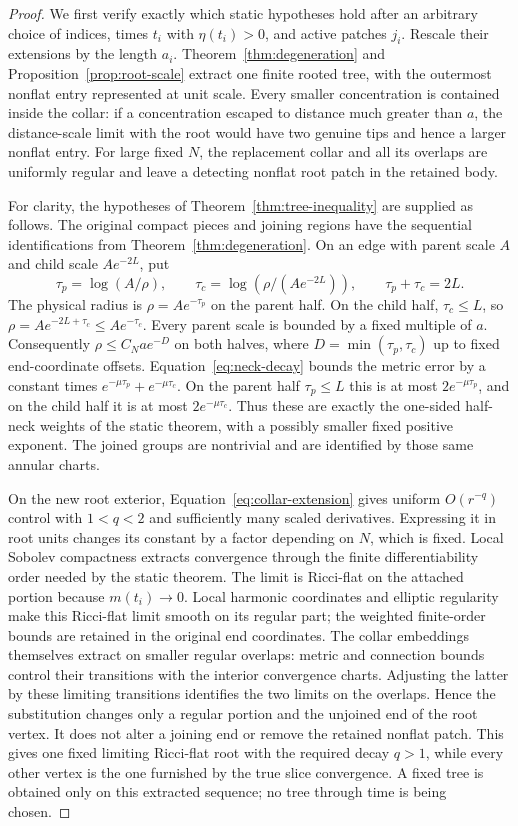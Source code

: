 \begin{proof}
We first verify exactly which static hypotheses hold after an
arbitrary choice of indices, times $t_i$ with $\eta(t_i)>0$, and
active patches $j_i$.  Rescale their extensions by the length $a_i$.
Theorem~\ref{thm:degeneration} and Proposition~\ref{prop:root-scale}
extract one finite rooted tree, with the outermost nonflat entry
represented at unit scale.  Every smaller concentration is contained
inside the collar: if a concentration escaped to distance much
greater than $a$, the distance-scale limit with the root would have
two genuine tips and hence a larger nonflat entry.  For large fixed
$N$, the replacement collar and all its overlaps are uniformly
regular and leave a detecting nonflat root patch in the retained
body.

For clarity, the hypotheses of Theorem~\ref{thm:tree-inequality}
are supplied as follows.  The original compact pieces and joining
regions have the sequential identifications from
Theorem~\ref{thm:degeneration}.  On an edge with parent scale $A$
and child scale $Ae^{-2L}$, put
\[
 \tau_p=\log(A/\rho),\qquad
 \tau_c=\log(\rho/(Ae^{-2L})),\qquad \tau_p+\tau_c=2L.
\]
The physical radius is $\rho=Ae^{-\tau_p}$ on the parent half.
On the child half, $\tau_c\le L$, so
$\rho=Ae^{-2L+\tau_c}\le Ae^{-\tau_c}$.
Every parent scale is bounded by a fixed multiple of $a$.
Consequently $\rho\le C_Nae^{-D}$ on both halves, where
$D=\min(\tau_p,\tau_c)$ up to fixed end-coordinate offsets.
Equation~\eqref{eq:neck-decay} bounds the metric error by a constant
times $e^{-\mu\tau_p}+e^{-\mu\tau_c}$.  On the parent half
$\tau_p\le L$ this is at most $2e^{-\mu\tau_p}$, and on the child
half it is at most $2e^{-\mu\tau_c}$.  Thus these are exactly the
one-sided half-neck weights of the static theorem, with a possibly
smaller fixed positive exponent.  The joined groups are nontrivial
and are identified by those same annular charts.

On the new root exterior, Equation~\eqref{eq:collar-extension}
gives uniform $O(r^{-q})$ control with $1<q<2$ and sufficiently many
scaled derivatives.  Expressing it in root units changes its
constant by a factor depending on $N$, which is fixed.  Local Sobolev
compactness extracts convergence through the finite differentiability
order needed by the static theorem.  The limit is Ricci-flat on
the attached portion because $m(t_i)\to0$.  Local harmonic
coordinates and elliptic regularity make this Ricci-flat limit smooth
on its regular part; the weighted finite-order bounds are retained
in the original end coordinates.  The collar embeddings themselves
extract on smaller regular overlaps: metric and
connection bounds control their transitions with the interior
convergence charts.  Adjusting the latter by these limiting
transitions identifies the two limits on the overlaps.  Hence the
substitution changes only a regular portion and the unjoined end
of the root vertex.  It does not alter a joining end or remove the
retained nonflat patch.  This gives one fixed limiting Ricci-flat
root with the required decay $q>1$, while every other vertex is the
one furnished by the true slice convergence.  A fixed tree is
obtained only on this extracted sequence; no tree through time is
being chosen.


\end{proof}
